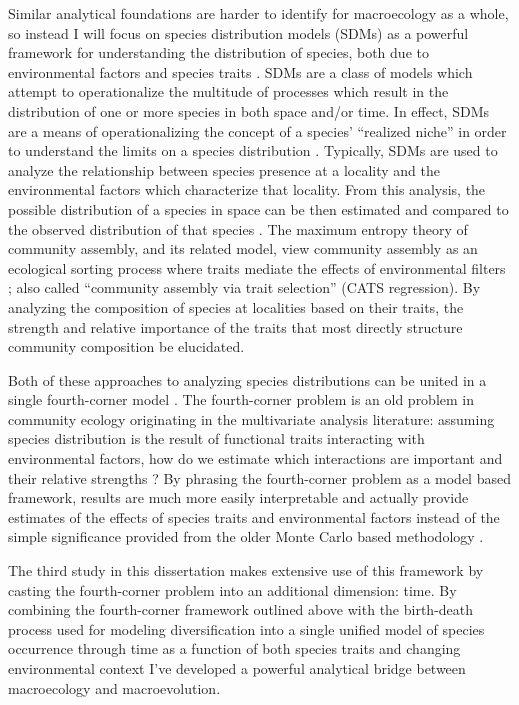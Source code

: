 Similar analytical foundations are harder to identify for macroecology as a whole, so instead I will focus on species distribution models (SDMs) as a powerful framework for understanding the distribution of species, both due to environmental factors \citep{Elith2009} and species traits \citep{Shipley2006}. SDMs are a class of models which attempt to operationalize the multitude of processes which result in the distribution of one or more species in both space and/or time. In effect, SDMs are a means of operationalizing the concept of a species' ``realized niche'' in order to understand the limits on a species distribution \citep{Elith2009}. Typically, SDMs are used to analyze the relationship between species presence at a locality and the environmental factors which characterize that locality. From this analysis, the possible distribution of a species in space can be then estimated and compared to the observed distribution of that species \citep{Elith2009,Austin2006,Phillips2006a}. The maximum entropy theory of community assembly, and its related model, view community assembly as an ecological sorting process where traits mediate the effects of environmental filters \citep{Shipley2006,Warton2015a}; also called ``community assembly via trait selection'' (CATS regression). By analyzing the composition of species at localities based on their traits, the strength and relative importance of the traits that most directly structure community composition be elucidated. 

Both of these approaches to analyzing species distributions can be united in a single fourth-corner model \citep{Warton2015a,Brown2014c}. The fourth-corner problem is an old problem in community ecology originating in the multivariate analysis literature: assuming species distribution is the result of functional traits interacting with environmental factors, how do we estimate which interactions are important and their relative strengths \citep{Legendre1997,Dray2008}? By phrasing the fourth-corner problem as a model based framework, results are much more easily interpretable and actually provide estimates of the effects of species traits and environmental factors instead of the simple significance provided from the older Monte Carlo based methodology \citep{Brown2014c,Jamil2013,Pollock2012,Pollock2015}.

The third study in this dissertation makes extensive use of this framework by casting the fourth-corner problem into an additional dimension: time. By combining the fourth-corner framework outlined above \citep{Warton2015a,Brown2014c} with the birth-death process used for modeling diversification into a single unified model of species occurrence through time as a function of both species traits and changing environmental context I've developed a powerful analytical bridge between macroecology and macroevolution.

